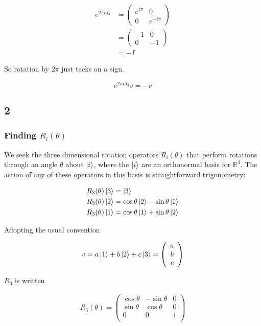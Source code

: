 \documentclass[12pt]{article}
\begin{document}
\begin{align*}
e^{2\pi i J_3} &= \left(\begin{array}{cc}
e^{i\pi} & 0 \\
0 & e^{-i\pi}
\end{array}\right) \\[6pt]
&= \left(\begin{array}{cc}
-1 & 0 \\
0 & -1
\end{array}\right) \\[6pt]
&= -I
\end{align*}

So rotation by \(2\pi\) just tacks on a sign.

\[e^{2\pi i J_3}v = -v
\]

\subsection*{2}

\subsubsection*{Finding \(R_i(\theta)\)}

We seek the three dimensional rotation operators \(R_i(\theta)\) that perform rotations through an angle \(\theta\) about \(\Ket{i}\), where the \(\Ket{i}\) are an orthonormal basis for \(\mathbb{R}^3\). The action of any of these operators in this basis is straightforward trigonometry:

\begin{align*}
R_3(\theta)\Ket{3} &= \Ket{3} \\
R_3(\theta)\Ket{2} &= \cos\theta\Ket{2} - \sin\theta\Ket{1} \\
R_3(\theta)\Ket{1} &= \cos\theta\Ket{1} + \sin\theta\Ket{2} \\
\end{align*}

Adopting the usual convention

\begin{align*}
v = a\Ket{1}+b\Ket{2}+c\Ket{3} = \left( \begin{array}{c} a \\ b \\c\end{array}\right)
\end{align*}

\(R_3\) is written

\begin{align*}
R_3(\theta)=\left(
\begin{array}{ccc}
 \cos \theta  & -\sin \theta  & 0 \\
 \sin \theta  & \cos \theta  & 0 \\
 0 & 0 & 1 \\
\end{array}
\right)
\end{align*}
\end{document}
